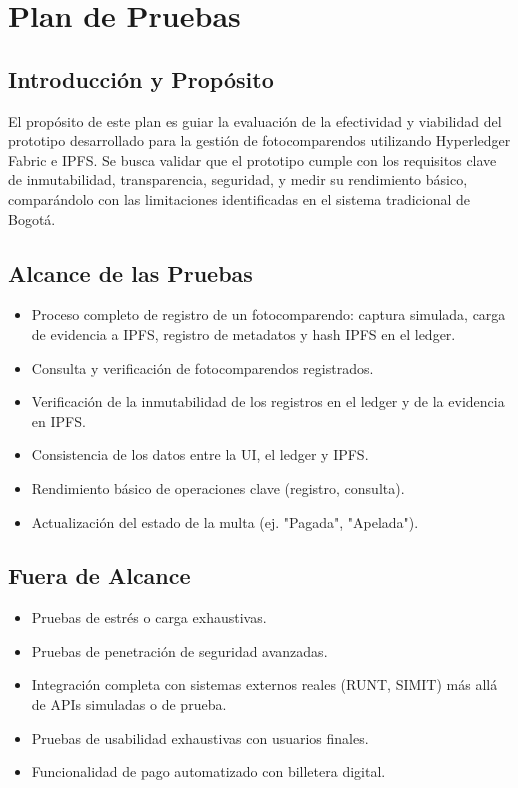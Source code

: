 \section{Plan de Pruebas}

\subsection{Introducción y Propósito}
El propósito de este plan es guiar la evaluación de la efectividad y viabilidad del prototipo desarrollado para la gestión de fotocomparendos utilizando Hyperledger Fabric e IPFS. Se busca validar que el prototipo cumple con los requisitos clave de inmutabilidad, transparencia, seguridad, y medir su rendimiento básico, comparándolo con las limitaciones identificadas en el sistema tradicional de Bogotá.

\subsection{Alcance de las Pruebas}
\begin{itemize}
    \item Proceso completo de registro de un fotocomparendo: captura simulada, carga de evidencia a IPFS, registro de metadatos y hash IPFS en el ledger.
    \item Consulta y verificación de fotocomparendos registrados.
    \item Verificación de la inmutabilidad de los registros en el ledger y de la evidencia en IPFS.
    \item Consistencia de los datos entre la UI, el ledger y IPFS.
    \item Rendimiento básico de operaciones clave (registro, consulta).
    \item Actualización del estado de la multa (ej. "Pagada", "Apelada").
\end{itemize}

\subsection{Fuera de Alcance}
\begin{itemize}
    \item Pruebas de estrés o carga exhaustivas.
    \item Pruebas de penetración de seguridad avanzadas.
    \item Integración completa con sistemas externos reales (RUNT, SIMIT) más allá de APIs simuladas o de prueba.
    \item Pruebas de usabilidad exhaustivas con usuarios finales.
    \item Funcionalidad de pago automatizado con billetera digital.
\end{itemize}

